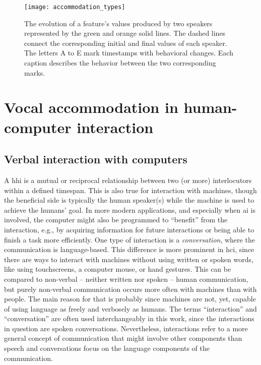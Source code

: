 \begin{figure}[t]
	\centering
	\texttt{[image: accommodation\_types]}
	\caption[Different accommodation types in a conversation]
		{The evolution of a feature's values produced by two speakers represented by the green and orange solid lines.
		The dashed lines connect the corresponding initial and final values of each speaker.
		The letters A to E mark timestamps with behavioral changes.
		Each caption describes the behavior between the two corresponding marks.}
	\label{fig:accommodation_types}
\end{figure}

\section{Vocal accommodation in human-computer interaction}
\label{sec:phonetic_convergence_in_hci}


\subsection{Verbal interaction with computers}
\label{subsec:verbal_interaction}

A \acf{hhi} is a mutual or reciprocal relationship between two (or more) interlocutors within a defined timespan.
This is also true for interaction with machines, though the beneficial side is typically the human speaker(s) while the machine is used to achieve the humans' goal.
In more modern applications, and especially when \ac{ai} is involved, the computer might also be programmed to \enquote{benefit} from the interaction, e.g., by acquiring information for future interactions or being able to finish a task more efficiently.
One type of interaction is a \emph{conversation}, where the communication is language-based.
This difference is more prominent in \ac{hci}, since there are ways to interact with machines without using written or spoken words, like using touchscreens, a computer mouse, or hand gestures. This can be compared to non-verbal -- neither written nor spoken -- human communication, but purely non-verbal communication occurs more often with machines than with people.
The main reason for that is probably since machines are not, yet, capable of using language as freely and verbosely as humans.
The terms \enquote{interaction} and \enquote{conversation} are often used interchangeably in this work, since the interactions in question are spoken conversations.
Nevertheless, interactions refer to a more general concept of communication that might involve other components than speech and conversations focus on the language components of the communication.

